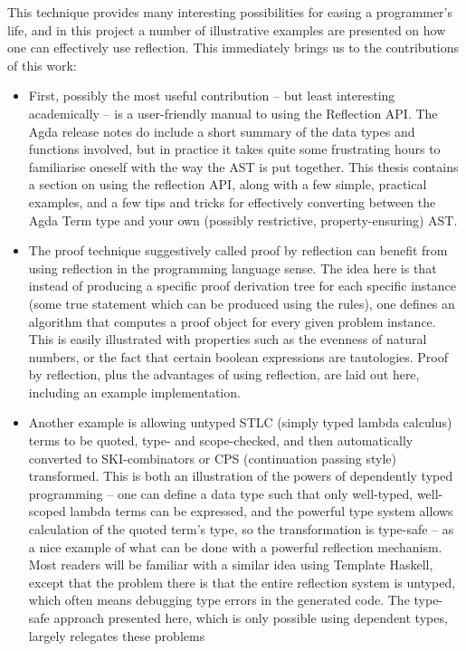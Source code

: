 \documentclass[a4paper]{article}
\begin{document}
This technique provides many interesting possibilities for easing a programmer's life, and in
this project a number of illustrative
examples are presented on how one can effectively use reflection.
This immediately brings us to the contributions of this work:

\begin{itemize}
  \item First, possibly the most useful contribution -- but least
interesting academically -- is a user-friendly manual to using the
Reflection API. The Agda release notes\cite{agda-relnotes-228} do
include a short summary of the data types and functions involved, but
in practice it takes quite some frustrating hours to familiarise
oneself with the way the AST is put together. This thesis contains a
section on using the reflection API, along with a few simple,
practical examples, and a few tips and tricks for effectively
converting between the Agda Term type and your own (possibly
restrictive, property-ensuring) AST.
  \item The proof technique suggestively called proof by reflection
can benefit from using reflection in the programming language
sense. The idea here is that instead of producing a specific proof
derivation tree for each specific instance (some true statement which
can be produced using the rules), one defines an algorithm that computes a proof object for every given problem instance. This is easily illustrated
with properties such as the evenness of natural numbers, or the fact
that certain boolean expressions are tautologies. Proof by reflection,
plus the advantages of using reflection, are laid out here, including
an example implementation.
  \item Another example is allowing untyped STLC (simply typed lambda
calculus) terms to be quoted, type- and scope-checked, and then
automatically converted to SKI-combinators or CPS (continuation
passing style) transformed. This is both an illustration of the powers of
dependently typed programming -- one can define a data type such
that only well-typed, well-scoped lambda terms can be expressed, and the
powerful type system allows calculation of the quoted term's type, so the transformation
is type-safe -- as a
nice example of what can be done with a powerful reflection mechanism. Most
readers will be familiar with a similar idea using Template Haskell, except that
the problem there is that the entire reflection system is untyped, which often
means debugging type errors in the generated code. The type-safe approach presented
here, which is only possible using dependent types, largely relegates these problems

\end{itemize}
\end{document}
